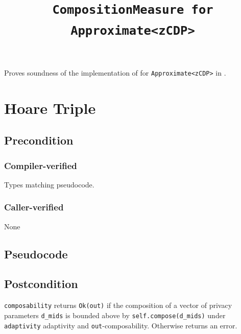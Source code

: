 \documentclass{article}
\title{\texttt{CompositionMeasure for Approximate<zCDP>}}
\author{\MichaelShoemateAuthor}
\date{}
\begin{document}
\maketitle

\contrib
Proves soundness of the implementation of  
for \texttt{Approximate<zCDP>} in .

\section{Hoare Triple}
\subsection*{Precondition}
\subsubsection*{Compiler-verified}
Types matching pseudocode.


\subsubsection*{Caller-verified}
None

\subsection*{Pseudocode}


\subsection*{Postcondition}
\begin{theorem}
  \texttt{composability} returns \texttt{Ok(out)} if the composition of a vector of privacy parameters \texttt{d\_mids} 
  is bounded above by \texttt{self.compose(d\_mids)} under \texttt{adaptivity} adaptivity and \texttt{out}-composability.
  Otherwise returns an error.
\end{theorem}
\end{document}
